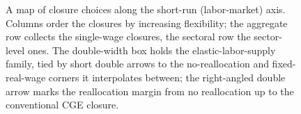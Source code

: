 \begin{figure}[htbp]
\caption{A map of closure choices along the short-run (labor-market)
  axis. Columns order the closures by increasing flexibility; the
  aggregate row collects the single-wage closures, the sectoral row the
  sector-level ones. The double-width box holds the elastic-labor-supply
  family, tied by short double arrows to the no-reallocation and
  fixed-real-wage corners it interpolates between; the right-angled
  double arrow marks the reallocation margin from no reallocation up to
  the conventional CGE closure.}
\label{fig:flexibility-map}
\end{figure}